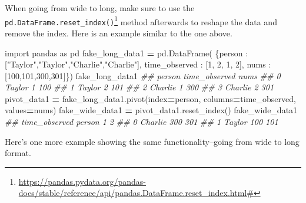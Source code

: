 \documentclass[
  12pt,
  krantz2]{krantz}
\makeatletter
\newenvironment{Shaded}{\begin{snugshade}}{\end{snugshade}}
\newcommand{\CommentTok}[1]{\textcolor[rgb]{0.37,0.37,0.37}{\textit{#1}}}
\newcommand{\DecValTok}[1]{\textcolor[rgb]{0.06,0.06,0.06}{#1}}
\newcommand{\ImportTok}[1]{#1}
\newcommand{\NormalTok}[1]{#1}
\newcommand{\OperatorTok}[1]{\textcolor[rgb]{0.43,0.43,0.43}{\textbf{#1}}}
\newcommand{\StringTok}[1]{\textcolor[rgb]{0.5,0.5,0.5}{#1}}
\renewcommand{\href}[2]{#2\footnote{\url{#1}}}
\newenvironment{kframe}{%
\medskip{}
\setlength{\fboxsep}{.8em}
 \def\at@end@of@kframe{}%
 \ifinner\ifhmode%
  \def\at@end@of@kframe{\end{minipage}}%
  \begin{minipage}{\columnwidth}%
 \fi\fi%
 \def\FrameCommand##1{\hskip\@totalleftmargin \hskip-\fboxsep
 \colorbox{shadecolor}{##1}\hskip-\fboxsep
     \hskip-\linewidth \hskip-\@totalleftmargin \hskip\columnwidth}%
 \MakeFramed {\advance\hsize-\width
   \@totalleftmargin\z@ \linewidth\hsize
   \@setminipage}}%
 {\par\unskip\endMakeFramed%
 \at@end@of@kframe}
\renewenvironment{Shaded}{\begin{kframe}}{\end{kframe}}
\makeatother
\begin{document}
When going from wide to long, make sure to use the \href{https://pandas.pydata.org/pandas-docs/stable/reference/api/pandas.DataFrame.reset_index.html\#}{\texttt{pd.DataFrame.reset\_index()}} method afterwards to reshape the data and remove the index. Here is an example similar to the one above.

\begin{Shaded}
\begin{Highlighting}[]
\ImportTok{import}\NormalTok{ pandas }\ImportTok{as}\NormalTok{ pd}
\NormalTok{fake\_long\_data1 }\OperatorTok{=}\NormalTok{ pd.DataFrame(}
\NormalTok{  \{}\StringTok{\textquotesingle{}person\textquotesingle{}}\NormalTok{ : [}\StringTok{"Taylor"}\NormalTok{,}\StringTok{"Taylor"}\NormalTok{,}\StringTok{"Charlie"}\NormalTok{,}\StringTok{"Charlie"}\NormalTok{], }
  \StringTok{\textquotesingle{}time\_observed\textquotesingle{}}\NormalTok{ : [}\DecValTok{1}\NormalTok{, }\DecValTok{2}\NormalTok{, }\DecValTok{1}\NormalTok{, }\DecValTok{2}\NormalTok{],}
  \StringTok{\textquotesingle{}nums\textquotesingle{}}\NormalTok{ : [}\DecValTok{100}\NormalTok{,}\DecValTok{101}\NormalTok{,}\DecValTok{300}\NormalTok{,}\DecValTok{301}\NormalTok{]\})}
\NormalTok{fake\_long\_data1}
\CommentTok{\#\#     person  time\_observed  nums}
\CommentTok{\#\# 0   Taylor              1   100}
\CommentTok{\#\# 1   Taylor              2   101}
\CommentTok{\#\# 2  Charlie              1   300}
\CommentTok{\#\# 3  Charlie              2   301}
\NormalTok{pivot\_data1 }\OperatorTok{=}\NormalTok{ fake\_long\_data1.pivot(index}\OperatorTok{=}\StringTok{\textquotesingle{}person\textquotesingle{}}\NormalTok{, }
\NormalTok{                                    columns}\OperatorTok{=}\StringTok{\textquotesingle{}time\_observed\textquotesingle{}}\NormalTok{, }
\NormalTok{                                    values}\OperatorTok{=}\StringTok{\textquotesingle{}nums\textquotesingle{}}\NormalTok{)}
\NormalTok{fake\_wide\_data1 }\OperatorTok{=}\NormalTok{ pivot\_data1.reset\_index()}
\NormalTok{fake\_wide\_data1}
\CommentTok{\#\# time\_observed   person    1    2}
\CommentTok{\#\# 0              Charlie  300  301}
\CommentTok{\#\# 1               Taylor  100  101}
\end{Highlighting}
\end{Shaded}

Here's one more example showing the same functionality--going from wide to long format.
\end{document}

